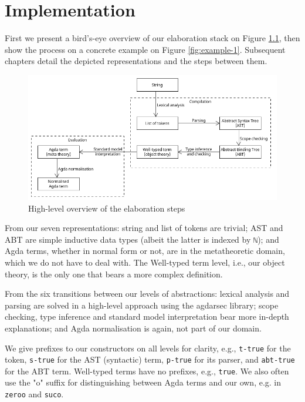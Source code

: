 \chapter{Implementation}
\label{ch:Implementation}

First we present a bird's-eye overview of our elaboration stack on Figure \ref{fig:architecture}, then show the process on a concrete example on Figure \ref{fig:example-1}. Subsequent chapters detail the depicted representations and the steps between them.

\begin{figure}[h!]
	\centering
	\includegraphics[width=1.0\textwidth]{../images/architecture.png}
	\caption{High-level overview of the elaboration steps}
	\label{fig:architecture}
\end{figure}

From our seven representations: string and list of tokens are trivial; AST and ABT are simple inductive data types (albeit the latter is indexed by \verb$ℕ$); and Agda terms, whether in normal form or not, are in the metatheoretic domain, which we do not have to deal with. The Well-typed term level, i.e., our object theory, is the only one that bears a more complex definition.

From the six transitions between our levels of abstractions: lexical analysis and parsing are solved in a high-level approach using the agdarsec library; scope checking, type inference and standard model interpretation bear more in-depth explanations; and Agda normalisation is again, not part of our domain.

We give prefixes to our constructors on all levels for clarity, e.g., \verb$t-true$ for the token, \verb$s-true$ for the AST (syntactic) term, \verb$p-true$ for its parser, and \verb$abt-true$ for the ABT term. Well-typed terms have no prefixes, e.g., \verb$true$. We also often use the "o" suffix for distinguishing between Agda terms and our own, e.g. in \verb$zeroo$ and \verb$suco$.

